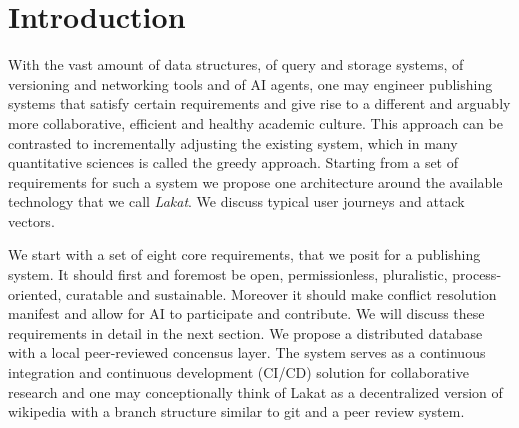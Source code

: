 \documentclass[14pt]{article}
\title{\sc{Lakat}\break \sc{A Publishing Architecture}}
\author{Leonhard Horstmeyer \\
\remark{Do not distribute}}
\date{\today}
\begin{document}
\maketitle

\tableofcontents

\begin{abstract}
    
\end{abstract}


\section{Introduction}

With the vast amount of data structures, of query and storage systems, of versioning and networking tools and of AI agents, one may engineer publishing systems that satisfy certain requirements and give rise to a different and arguably more collaborative, efficient and healthy academic culture. This approach can be contrasted  to incrementally adjusting the existing system, which in many quantitative sciences is called the greedy approach. Starting from a set of requirements for such a system we propose one architecture around the available technology that we call \textit{Lakat}.
We discuss typical user journeys and attack vectors.

We start with a set of eight core requirements, that we posit for a publishing system. It should first and foremost be open, permissionless, pluralistic, process-oriented, curatable and sustainable. Moreover it should make conflict resolution manifest and allow for AI to participate and contribute. We will discuss these requirements in detail in the next section. We propose a distributed database with a local peer-reviewed concensus layer. The system serves as a continuous integration and continuous development (CI/CD) solution for collaborative research and one may conceptionally think of Lakat as a decentralized version of wikipedia with a branch structure similar to git and a peer review system.
\end{document}
